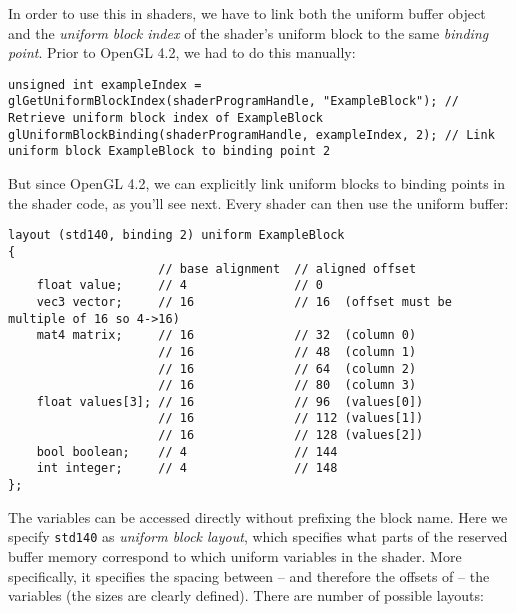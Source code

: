\documentclass[8pt, table, xcdraw]{article}%
\begin{document}
In order to use this in shaders, we have to link both the uniform buffer object and the \emph{uniform block index} of the shader's uniform block to the same \emph{binding point}. Prior to OpenGL 4.2, we had to do this manually:

\begin{lstlisting}
unsigned int exampleIndex = glGetUniformBlockIndex(shaderProgramHandle, "ExampleBlock"); // Retrieve uniform block index of ExampleBlock
glUniformBlockBinding(shaderProgramHandle, exampleIndex, 2); // Link uniform block ExampleBlock to binding point 2
\end{lstlisting}

But since OpenGL 4.2, we can explicitly link uniform blocks to binding points in the shader code, as you'll see next. Every shader can then use the uniform buffer:

\begin{lstlisting}
layout (std140, binding 2) uniform ExampleBlock
{
                     // base alignment  // aligned offset
    float value;     // 4               // 0 
    vec3 vector;     // 16              // 16  (offset must be multiple of 16 so 4->16)
    mat4 matrix;     // 16              // 32  (column 0)
                     // 16              // 48  (column 1)
                     // 16              // 64  (column 2)
                     // 16              // 80  (column 3)
    float values[3]; // 16              // 96  (values[0])
                     // 16              // 112 (values[1])
                     // 16              // 128 (values[2])
    bool boolean;    // 4               // 144
    int integer;     // 4               // 148
};
\end{lstlisting}

The variables can be accessed directly without prefixing the block name. Here we specify \lstinline{std140} as \emph{uniform block layout}, which specifies what parts of the reserved buffer memory correspond to which uniform variables in the shader. More specifically, it specifies the spacing between -- and therefore the offsets of -- the variables (the sizes are clearly defined). There are number of possible layouts:
\end{document}
